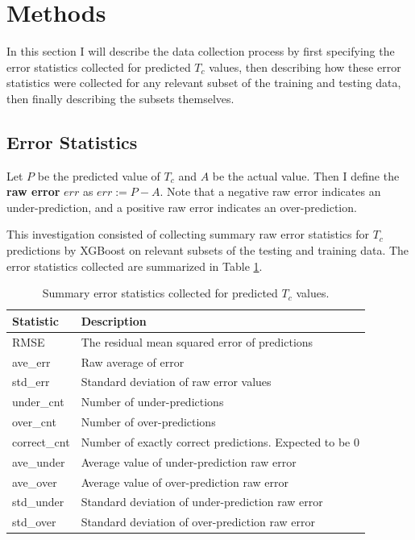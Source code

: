 \documentclass[oneside,12pt]{amsart}
\begin{document}
 \section{Methods}
  In this section I will describe the data collection process by first specifying the error statistics collected for predicted $T_c$ values, then describing how these error statistics were collected for any relevant subset of the training and testing data, then finally describing the subsets themselves.
 
 \subsection{Error Statistics}
 
 Let $P$ be the predicted value of $T_c$ and $A$ be the actual value. Then I define the \textbf{raw error} $err$ as $err := P-A$. Note that a negative raw error indicates an under-prediction, and a positive raw error indicates an over-prediction.
 
 This investigation consisted of collecting summary raw error statistics for $T_c$ predictions by XGBoost on relevant subsets of the testing and training data. The error statistics collected are summarized in Table \ref{tab:err_stats}.
 
 \begin{table}[ht]
     \centering
     \begin{tabularx}{\linewidth}{X X}
     \hline
     Statistic & Description\\
     \hline
       RMSE & The residual mean squared error of predictions \\
        ave\_err  & Raw average of error\\
        std\_err & Standard deviation of raw error values\\
        under\_cnt & Number of under-predictions\\
        over\_cnt & Number of over-predictions\\
        correct\_cnt & Number of exactly correct predictions. Expected to be 0\\
        ave\_under & Average value of under-prediction raw error\\
        ave\_over & Average value of over-prediction raw error\\
        std\_under & Standard deviation of under-prediction raw error\\
        std\_over & Standard deviation of over-prediction raw error\\
        \hline
     \end{tabularx}
     \caption{Summary error statistics collected for predicted $T_c$ values.}
     \label{tab:err_stats}
 \end{table}
 
\end{document}
